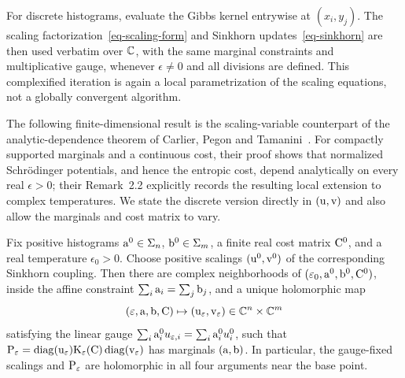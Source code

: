 For discrete histograms, evaluate the Gibbs kernel entrywise at $(x_i,y_j)$. The scaling factorization~\eqref{eq-scaling-form} and Sinkhorn updates~\eqref{eq-sinkhorn} are then used verbatim over $\CC$, with the same marginal constraints and multiplicative gauge, whenever $\epsilon\neq0$ and all divisions are defined. This complexified iteration is again a local parametrization of the scaling equations, not a globally convergent algorithm.

The following finite-dimensional result is the scaling-variable counterpart of the analytic-dependence theorem of Carlier, Pegon and Tamanini~\cite[Theorem~2.1 and Remark~2.2]{CarlierPegonTamanini2023EntropicRates}. For compactly supported marginals and a continuous cost, their proof shows that normalized Schr\"odinger potentials, and hence the entropic cost, depend analytically on every real $\epsilon>0$; their Remark~2.2 explicitly records the resulting local extension to complex temperatures. We state the discrete version directly in $(\uD,\vD)$ and also allow the marginals and cost matrix to vary.

\begin{thm}\label{thm-carlier-complex-sinkhorn}
	Fix positive histograms $\a^0\in\simplex_n$, $\b^0\in\simplex_m$, a finite real cost matrix $\C^0$, and a real temperature $\epsilon_0>0$. Choose positive scalings $(\uD^0,\vD^0)$ of the corresponding Sinkhorn coupling. Then there are complex neighborhoods of $(\epsilon_0,\a^0,\b^0,\C^0)$, inside the affine constraint $\sum_i \a_i=\sum_j \b_j$, and a unique holomorphic map
	\[
		(\epsilon,\a,\b,\C)\mapsto(\uD_\epsilon,\vD_\epsilon)\in\CC^n\times\CC^m
	\]
	satisfying the linear gauge $\sum_i\a_i^0u_{\epsilon,i}=\sum_i\a_i^0u_i^0$, such that
	$\P_\epsilon=\diag(\uD_\epsilon)\K_\epsilon(\C)\diag(\vD_\epsilon)$ has marginals $(\a,\b)$. In particular, the gauge-fixed scalings and $\P_\epsilon$ are holomorphic in all four arguments near the base point.
\end{thm}

